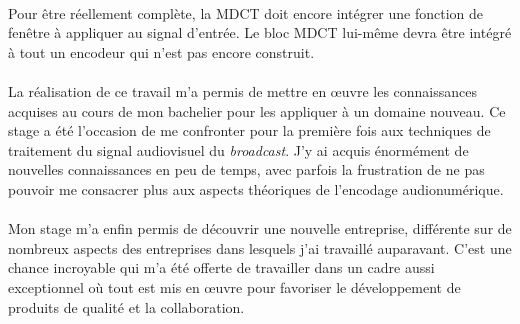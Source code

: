 \documentclass{article}
\begin{document}
    \paragraph{}
    Pour être réellement complète, la MDCT doit encore intégrer une fonction de fenêtre à appliquer au signal d'entrée. Le bloc MDCT lui-même devra être intégré à tout un encodeur qui n'est pas encore construit.

    \paragraph{}
    La réalisation de ce travail m'a permis de mettre en \oe uvre les connaissances acquises au cours de mon bachelier pour les appliquer à un domaine nouveau. Ce stage a été l'occasion de me confronter pour la première fois aux techniques de traitement du signal audiovisuel du \emph{broadcast}. J'y ai acquis énormément de nouvelles connaissances en peu de temps, avec parfois la frustration de ne pas pouvoir me consacrer plus aux aspects théoriques de l'encodage audionumérique.

    \paragraph{}
    Mon stage m'a enfin permis de découvrir une nouvelle entreprise, différente sur de nombreux aspects des entreprises dans lesquels j'ai travaillé auparavant. C'est une chance incroyable qui m'a été offerte de travailler dans un cadre aussi exceptionnel où tout est mis en \oe uvre pour favoriser le développement de produits de qualité et la collaboration.



    \newpage
    
    

    
\end{document}
